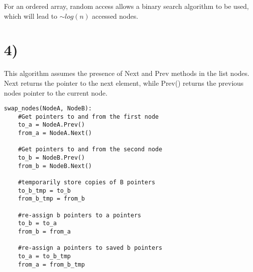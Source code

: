 \documentclass[a4paper,11pt]{article}
\begin{document}
For an ordered array, random access allows a binary search algorithm to be used, which will lead to $\sim log(n)$ accessed nodes.



\section*{4)} 
This algorithm assumes the presence of Next and Prev methods in the list nodes.  Next returns the pointer to the next element, while Prev() returns the previous nodes pointer to the current node. 

\begin{verbatim}
swap_nodes(NodeA, NodeB):
    #Get pointers to and from the first node
    to_a = NodeA.Prev()
    from_a = NodeA.Next()
    
    #Get pointers to and from the second node
    to_b = NodeB.Prev()
    from_b = NodeB.Next()
    
    #temporarily store copies of B pointers
    to_b_tmp = to_b
    from_b_tmp = from_b
    
    #re-assign b pointers to a pointers
    to_b = to_a
    from_b = from_a
    
    #re-assign a pointers to saved b pointers
    to_a = to_b_tmp
    from_a = from_b_tmp
\end{verbatim}

\end{document}
